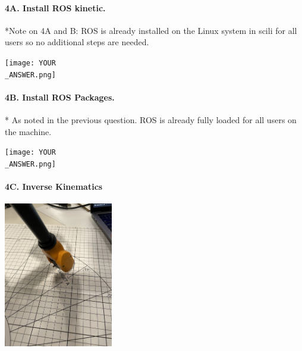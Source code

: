 
\paragraph{4A. Install ROS kinetic.}

*Note on 4A and B: ROS is already installed on the Linux system in scili for all users so no additional steps are needed.

\begin{center}
    \texttt{[image: YOUR\\\_ANSWER.png]}
\end{center}

\paragraph{4B. Install ROS Packages.}

* As noted in the previous question. ROS is already fully loaded for all users on the machine.

\begin{center}
    \texttt{[image: YOUR\\\_ANSWER.png]}
\end{center}

\newpage
\paragraph{4C. Inverse Kinematics}
\begin{center}
    \includegraphics[height=2.5in]{image/4c_a.jpg}
\end{center}

